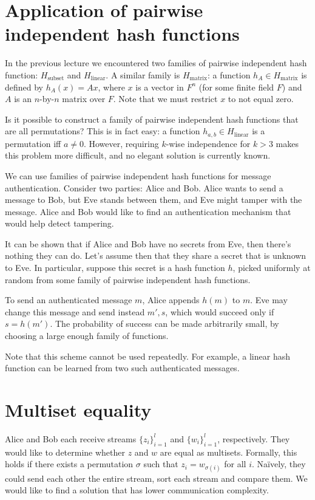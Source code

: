 \documentclass{article}
\begin{document}
\section{Application of pairwise independent hash functions}
In the previous lecture we encountered two families of pairwise
independent hash function: $H_{\mathrm{subset}}$ and
$H_{\mathrm{linear}}$. A similar family is $H_{\mathrm{matrix}}$: a
function $h_A \in H_{\mathrm{matrix}}$ is defined by $h_A(x) = Ax$,
where $x$ is a vector in $F^n$ (for some finite field $F$) and
$A$ is an $n$-by-$n$ matrix over $F$. Note that we must restrict $x$
to not equal zero.

Is it possible to construct a family of pairwise independent hash
functions that are all permutations? This is in fact easy: a function
$h_{a,b} \in H_{\mathrm{linear}}$ is a permutation iff $a \neq
0$. However, requiring $k$-wise independence for $k>3$ makes this
problem more difficult, and no elegant solution is currently known.

We can use families of pairwise independent hash functions for message
authentication. Consider two parties: Alice and Bob. Alice wants to
send a message to Bob, but Eve stands between them, and Eve might
tamper with the message. Alice and Bob would like to find an
authentication mechanism that would help detect tampering.

It can be shown that if Alice and Bob have no secrets from Eve, then
there's nothing they can do. Let's assume then that they share a
secret that is unknown to Eve. In particular, suppose this secret is a
hash function $h$, picked uniformly at random from some family of
pairwise independent hash functions.

To send an authenticated message $m$, Alice appends $h(m)$ to $m$. Eve
may change this message and send instead $m',s$, which would succeed
only if $s=h(m')$. The probability of success can be made arbitrarily
small, by choosing a large enough family of functions.

Note that this scheme cannot be used repeatedly. For example, a linear
hash function can be learned from two such authenticated messages.

\section{Multiset equality}
Alice and Bob each receive streams $\{z_i\}_{i=1}^l$ and
$\{w_i\}_{i=1}^l$, respectively. They would like to determine whether
$z$ and $w$ are equal as multisets. Formally, this holds if there
exists a permutation $\sigma$ such that $z_i=w_{\sigma(i)}$ for all
$i$. Na\"ively, they could send each other the entire stream, sort
each stream and compare them. We would like to find a solution that
has lower communication complexity.
\end{document}
